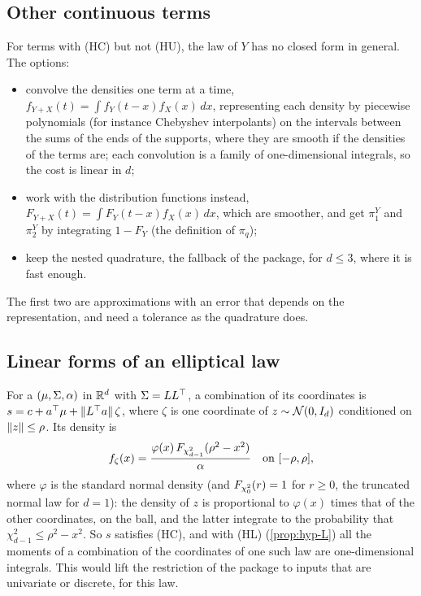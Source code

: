 \documentclass[11pt,a4paper]{article}
\numberwithin{equation}{section}
\newcommand{\slt}[2]{\pi^{#1}_{#2}}      %
\newcommand{\Hyp}[1]{\textup{(H#1)}}    %
\begin{document}
\subsection{Other continuous terms}
\label{sec:sums-general}

For terms with \Hyp{C} but not \Hyp{U}, the law of $Y$ has no closed form in general.
The options:
\begin{itemize}[nosep]
\item convolve the densities one term at a time, $f_{Y + X}(t) = \int f_Y(t - x)f_X(x)\,dx$,
representing each density by piecewise polynomials (for instance Chebyshev interpolants) on the intervals between the sums of the ends of the supports, where they are smooth if the densities of the terms are;
each convolution is a family of one-dimensional integrals, so the cost is linear in $d$;
\item work with the distribution functions instead, $F_{Y+X}(t) = \int F_Y(t - x)f_X(x)\,dx$, which are smoother, and get $\slt Y1$ and $\slt Y2$ by integrating $1 - F_Y$ (the definition of $\slt{}q$);
\item keep the nested quadrature, the fallback of the package, for $d \le 3$, where it is fast enough.
\end{itemize}
The first two are approximations with an error that depends on the representation, and need a tolerance as the quadrature does.

\subsection{Linear forms of an elliptical law}
\label{sec:sums-elliptical}

For a $(\mu, \Sigma, \alpha)$ in $\mathbb{R}^d$ with $\Sigma = LL^\top$, a combination of its coordinates is $s = c + a^\top\mu + \lVert L^\top a \rVert\,\zeta$, where $\zeta$ is one coordinate of $z \sim \mathcal{N}(0, I_d)$ conditioned on $\lVert z \rVert \le \rho$.
Its density is
\[
f_\zeta(x) = \frac{\varphi(x)\,F_{\chi^2_{d-1}}(\rho^2 - x^2)}{\alpha} \quad \text{on } [-\rho, \rho],
\]
where $\varphi$ is the standard normal density (and $F_{\chi^2_{0}}(r) = 1$ for $r \ge 0$, the truncated normal law for $d = 1$):
the density of $z$ is proportional to $\varphi(x)$ times that of the other coordinates, on the ball, and the latter integrate to the probability that $\chi^2_{d-1} \le \rho^2 - x^2$.
So $s$ satisfies \Hyp{C}, and with \Hyp{L} (\cref{prop:hyp-L}) all the moments of a combination of the coordinates of one such law are one-dimensional integrals.
This would lift the restriction of the package to inputs that are univariate or discrete, for this law.
\end{document}
